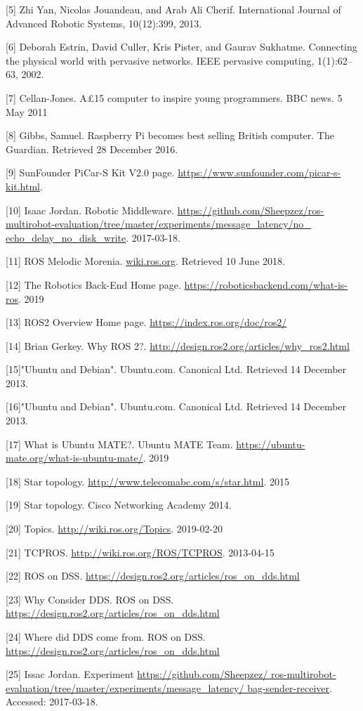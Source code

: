 \documentclass{mproj}
\begin{document}
[5] Zhi Yan, Nicolas Jouandeau, and Arab Ali Cherif. International Journal of Advanced Robotic Systems, 10(12):399, 2013.

[6] Deborah Estrin, David Culler, Kris Pister, and Gaurav Sukhatme. Connecting the physical world with pervasive networks. IEEE pervasive computing, 1(1):62–63, 2002.

[7] Cellan-Jones. A£15 computer to inspire young programmers. BBC news. 5 May 2011

[8] Gibbs, Samuel. Raspberry Pi becomes best selling British computer. The Guardian. Retrieved 28 December 2016.

[9] SunFounder PiCar-S Kit V2.0 page. \url{https://www.sunfounder.com/picar-s-kit.html}. 

[10] Isaac Jordan. Robotic Middleware. \url{https://github.com/Sheepzez/ros-multirobot-evaluation/tree/master/experiments/message_latency/no_ echo_delay_no_disk_write}. 2017-03-18.

[11] ROS Melodic Morenia. \url{wiki.ros.org}. Retrieved 10 June 2018.

[12] The Robotics Back-End Home page. \url{https://roboticsbackend.com/what-is-ros}. 2019

[13] ROS2 Overview Home page. \url{https://index.ros.org/doc/ros2/}

[14]  Brian Gerkey. Why ROS 2?. \url{http://design.ros2.org/articles/why_ros2.html}

[15]"Ubuntu and Debian". Ubuntu.com. Canonical Ltd. Retrieved 14 December 2013.

[16]"Ubuntu and Debian". Ubuntu.com. Canonical Ltd. Retrieved 14 December 2013.

[17] What is Ubuntu MATE?. Ubuntu MATE Team. \url{https://ubuntu-mate.org/what-is-ubuntu-mate/}. 2019 

[18] Star topology. \url{http://www.telecomabc.com/s/star.html}. 2015

[19] Star topology. Cisco Networking Academy 2014.

[20] Topics. \url{http://wiki.ros.org/Topics}. 2019-02-20

[21] TCPROS. \url{http://wiki.ros.org/ROS/TCPROS}. 2013-04-15 

[22] ROS on DSS. \url{https://design.ros2.org/articles/ros_on_dds.html}

[23] Why Consider DDS. ROS on DSS. \url{https://design.ros2.org/articles/ros_on_dds.html}

[24] Where did DDS come from. ROS on DSS. \url{https://design.ros2.org/articles/ros_on_dds.html}

[25] Issac Jordan. Experiment \url{https://github.com/Sheepzez/ ros-multirobot-evaluation/tree/master/experiments/message_latency/ bag-sender-receiver}. Accessed: 2017-03-18.
\end{document}
